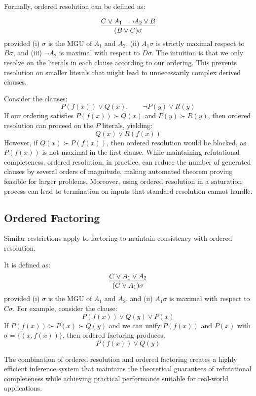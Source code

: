 Formally, ordered resolution can be defined as:

\begin{equation}
  \infer{(B\lor C)\sigma}{C\lor A_1 & \neg A_2 \lor B}
\end{equation}
\indent provided (i) \(\sigma\) is the MGU of \(A_1\) and \(A_2\), (ii) \(A_1\sigma\) is strictly maximal respect to \(B\sigma\), \indent and (iii) \(\neg A_2\) is maximal with respect to \(D\sigma\).
The intuition is that we only resolve on the  literals in each clause according to our ordering. This prevents resolution on smaller literals that might lead to unnecessarily complex derived clauses.

Consider the clauses:
\[P(f(x)) \lor Q(x), \qquad \neg P(y) \lor R(y)\]
If our ordering satisfies \(P(f(x)) \succ Q(x)\) and \(P(y) \succ R(y)\), then ordered resolution can proceed on the \(P\) literals, yielding:
\[Q(x) \lor R(f(x))\]
However, if \(Q(x) \succ P(f(x))\), then ordered resolution would be blocked, as \(P(f(x))\) is not maximal in the first clause.
While maintaining refutational completeness, ordered resolution, in practice, can reduce the number of generated clauses by several orders of magnitude, making automated theorem proving feasible for larger problems.
Moreover, using ordered resolution in a saturation process can lead to termination on inputs that standard resolution cannot handle.

\subsection{Ordered Factoring}\label{subsec:ordered-factoring}

Similar restrictions apply to factoring to maintain consistency with ordered resolution.

It is defined as:
\begin{equation}
  \infer{(C \lor A_1)\sigma}{C \lor A_1 \lor A_2}
\end{equation}
\indent provided (i) \(\sigma\) is the MGU of \(A_1\) and \(A_2\), and (ii) \(A_1\sigma\) is maximal with respect to \(C\sigma\).
For example, consider the clause:
\[P(f(x)) \lor Q(y) \lor P(x)\]
If \(P(f(x)) \succ P(x) \succ Q(y)\) and we can unify \(P(f(x))\) and \(P(x)\) with \(\sigma = \{(x , f(x))\}\), then ordered factoring produces:
\[P(f(x)) \lor Q(y)\]

The combination of ordered resolution and ordered factoring creates a highly efficient inference system that maintains the theoretical guarantees of refutational completeness while achieving practical performance suitable for real-world applications.



